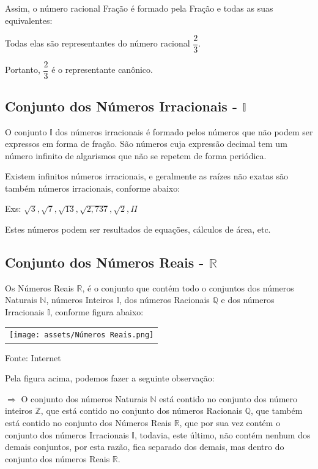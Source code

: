\begin{multicols*}{2}
    Assim, o número racional Fração é formado pela Fração e todas as suas equivalentes:

    Todas elas são representantes do número racional $\dfrac{2}{3} $.

    Portanto, $ \dfrac{2}{3} $ é o representante canônico.\\

    \subsection{Conjunto dos Números Irracionais - $\mathbb{I}$}

    O conjunto $\mathbb{I}$ dos números irracionais é formado pelos números que não podem ser expressos em forma de fração. São números cuja expressão decimal tem um número infinito de algarismos que não se repetem de forma periódica.

    Existem infinitos números irracionais, e geralmente as raízes não exatas são também números irracionais, conforme abaixo:

    Exs:  $\sqrt{3}, \sqrt{7}, \sqrt{13}, \sqrt{2,737}, \sqrt{2}, \Pi$

    Estes números podem ser resultados de equações, cálculos de área, etc.

    \subsection{Conjunto dos Números Reais - $\mathbb{R}$}

    Os Números Reais $\mathbb{R}$, é o conjunto que contém todo o conjuntos dos números Naturais $\mathbb{N}$, números Inteiros $\mathbb{I}$, dos números Racionais $\mathbb{Q}$ e dos números Irracionais $\mathbb{I}$, conforme figura abaixo:

    \begin{tabular}{@{}c@{}}
        \texttt{[image: assets/Números Reais.png]}
    \end{tabular}

    Fonte: Internet

    Pela figura acima, podemos fazer a seguinte observação:

    $\Rightarrow$ O conjunto dos números Naturais $\mathbb{N}$ está contido no conjunto dos número inteiros $\mathbb{Z}$, que está contido no conjunto dos números Racionais $\mathbb{Q}$, que também está contido no conjunto dos Números Reais $\mathbb{R}$, que por sua vez contém o conjunto dos números Irracionais $\mathbb{I}$, todavia, este último, não contém nenhum dos demais conjuntos, por esta razão, fica separado dos demais, mas dentro do conjunto dos números Reais $\mathbb{R}$.


\end{multicols*}
